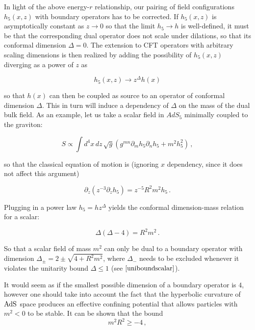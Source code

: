 In light of the above energy-$r$ relationship, our pairing of field configurations $h_5(x,z)$ with boundary operators has to be corrected. If $h_5(x,z)$ is asymptotically constant as $z\rightarrow 0$ so that the limit $h_5 \rightarrow h$ is well-defined, it must be that the corresponding dual operator does not scale under dilations, so that its conformal dimension $\Delta = 0$. The extension to CFT operators with arbitrary scaling dimensions is then realized by adding the possibility of $h_5(x,z)$ diverging as a power of $z$ as

\begin{equation}
	h_5(x,z) \rightarrow z^\Delta h(x)
\end{equation}

so that $h(x)$ can then be coupled as source to an operator of conformal dimension $\Delta$. This in turn will induce a dependency of $\Delta$ on the mass of the dual bulk field. As an example, let us take a scalar field in $AdS_5$ minimally coupled to the graviton:

\begin{equation}
	S \propto \int d^4 x\, dz \, \sqrt g \left( g^{mn} \partial_m h_5 \partial_n h_5 + m^2 h_5^2 \right)\,,
	\label{}
\end{equation}

so that the classical equation of motion is (ignoring $x$ dependency, since it does not affect this argument)

\begin{equation}
	\partial_z \left( z^{-3} \partial_z h_5 \right) = z^{-5} R^2 m^2 h_5 \,.
	\label{ }
\end{equation}

Plugging in a power law $h_5 = h z^\Delta$ yields the conformal dimension-mass relation for a scalar:

\begin{equation}
	\Delta (\Delta-4) = R^2 m^2\,.
	\label{}
\end{equation}

So that a scalar field of mass $m^2$ can only be dual to a boundary operator with dimension $\Delta_{\pm} = 2 \pm \sqrt{4 + R^2 m^2}$, where $\Delta_-$ needs to be excluded whenever it violates the unitarity bound $\Delta \leq 1$ (see $\eqref{uniboundscalar}$).

It would seem as if the smallest possible dimension of a boundary operator is $4$, however one should take into account the fact that the hyperbolic curvature of $\operatorname{AdS}_{}$ space produces an effective confining potential that allows particles with $m^2 < 0$ to be stable. It can be shown \cite{BFbound} that the bound
\begin{equation}
	m^2 R^2 \geq - 4\,,
	\label{}
\end{equation}

